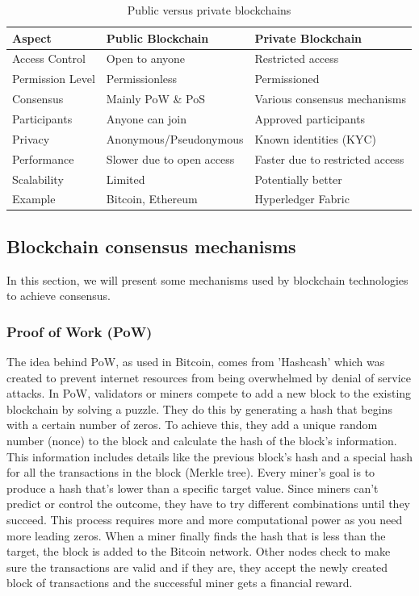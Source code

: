 \begin{table}[h!]
    \centering
    \begin{tabular}{l|ll}
        \textbf{Aspect}  & \textbf{Public Blockchain} & \textbf{Private Blockchain}     \\
        \hline
        Access Control   & Open to anyone             & Restricted access               \\[5pt]
        Permission Level & Permissionless             & Permissioned                    \\[5pt]
        Consensus        & Mainly PoW \& PoS          & Various consensus mechanisms    \\[5pt]
        Participants     & Anyone can join            & Approved participants           \\[5pt]
        Privacy          & Anonymous/Pseudonymous     & Known identities (KYC)          \\[5pt]
        Performance      & Slower due to open access  & Faster due to restricted access \\[5pt]
        Scalability      & Limited                    & Potentially better              \\[5pt]
        Example          & Bitcoin, Ethereum          & Hyperledger Fabric              \\[5pt]
    \end{tabular}
    \caption{Public versus private blockchains}
\end{table}

\subsection{Blockchain consensus mechanisms}
In this section, we will present some mechanisms used by blockchain technologies to achieve consensus.
\subsubsection{Proof of Work (PoW)}
The idea behind PoW, as used in Bitcoin, comes from 'Hashcash' which was created to prevent internet resources from being overwhelmed by denial of service attacks.
In PoW, validators or miners compete to add a new block to the existing blockchain by solving a puzzle. They do this by generating a hash that begins
with a certain number of zeros. To achieve this, they add a unique random number (nonce) to the block and calculate the hash of the block's information. This information
includes details like the previous block's hash and a special hash for all the transactions in the block (Merkle tree). Every miner's goal is to produce a hash that's
lower than a specific target value. Since miners can't predict or control the outcome, they have to try different combinations until they succeed. This process requires more
and more computational power as you need more leading zeros. When a miner finally finds the hash that is less than the target, the block is added to the Bitcoin network. Other
nodes check to make sure the transactions are valid and if they are, they accept the newly created block of transactions and the successful miner gets a financial reward.
\cite{andoni2019blockchain}

